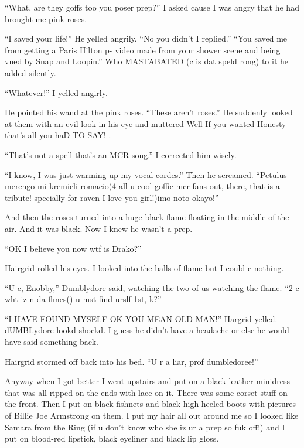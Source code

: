 \enquote{What, are they goffs too you poser prep?} I asked cause I was angry that he had brought me pink roses.

\enquote{I saved your life!} He yelled angrily. \enquote{No you didn't I replied.} \enquote{You saved me from getting a Paris Hilton p- video made from your shower scene and being vued by Snap and Loopin.} Who MASTABATED (c is dat speld rong) to it he added silently.

\enquote{Whatever!} I yelled angirly.

He pointed his wand at the pink roses. \enquote{These aren't roses.} He suddenly looked at them with an evil look in his eye and muttered Well If you wanted Honesty that's all you haD TO SAY! .

\enquote{That's not a spell that's an MCR song.} I corrected him wisely.

\enquote{I know, I was just warming up my vocal cordes.} Then he screamed. \enquote{Petulus merengo mi kremicli romacio(4 all u cool gof\-fic mcr fans out, there, that is a tribute! specially for raven I love you girl!)imo noto okayo!}

And then the roses turned into a huge black flame floating in the middle of the air. And it was black. Now I knew he wasn't a prep.

\enquote{OK I believe you now wtf is Drako?}

Hairgrid rolled his eyes. I looked into the balls of flame but I could c nothing.

\enquote{U c, Enobby,} Dumblydore said, watching the two of us watching the flame. \enquote{2 c wht iz n da flmes() u mst find urslf 1st, k?}

\enquote{I HAVE FOUND MYSELF OK YOU MEAN OLD MAN\@!} Hargrid yelled. dUMBLydore lookd shockd. I guess he didn't have a headache or else he would have said something back.

Hairgrid stormed off back into his bed. \enquote{U r a liar, prof dumbledoree!}

Anyway when I got better I went upstairs and put on a black leather minidress that was all ripped on the ends with lace on it. There was some corset stuff on the front. Then I put on black fishnets and black high-heeled boots with pictures of Billie Joe Armstrong on them. I put my hair all out around me so I looked like Samara from the Ring (if u don't know who she iz ur a prep so fuk off!) and I put on blood-red lipstick, black eyeliner and black lip gloss.

